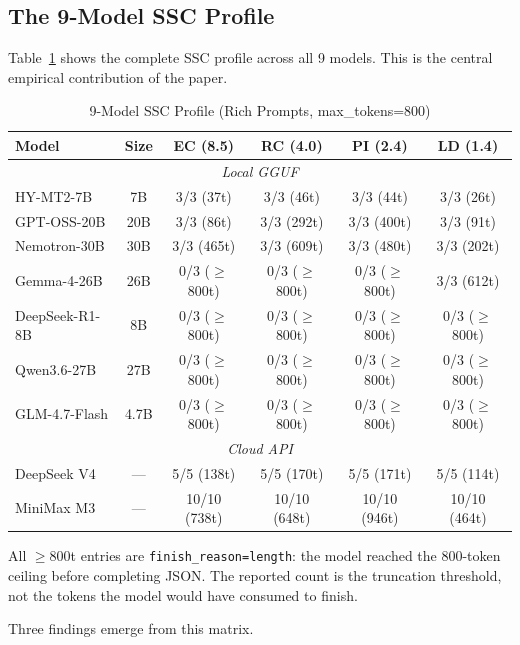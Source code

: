 \documentclass[11pt,a4paper]{article}
\begin{document}
\subsection{The 9-Model SSC Profile}

Table~\ref{tab:ssc_profile} shows the complete SSC profile across all 9 models. This is the central empirical contribution of the paper.

\begin{table}[htbp]\centering\caption{9-Model SSC Profile (Rich Prompts, max\_tokens=800)}\label{tab:ssc_profile}\footnotesize
\begin{tabular}{lccccc}\toprule\textbf{Model} & \textbf{Size} & \textbf{EC (8.5)} & \textbf{RC (4.0)} & \textbf{PI (2.4)} & \textbf{LD (1.4)}\\\midrule
\multicolumn{6}{c}{\textit{Local GGUF}}\\\midrule
HY-MT2-7B & 7B & 3/3 (37t) & 3/3 (46t) & 3/3 (44t) & 3/3 (26t)\\
GPT-OSS-20B & 20B & 3/3 (86t) & 3/3 (292t) & 3/3 (400t) & 3/3 (91t)\\
Nemotron-30B & 30B & 3/3 (465t) & 3/3 (609t) & 3/3 (480t) & 3/3 (202t)\\
Gemma-4-26B & 26B & 0/3 ($\geq$800t) & 0/3 ($\geq$800t) & 0/3 ($\geq$800t) & 3/3 (612t)\\
DeepSeek-R1-8B & 8B & 0/3 ($\geq$800t) & 0/3 ($\geq$800t) & 0/3 ($\geq$800t) & 0/3 ($\geq$800t)\\
Qwen3.6-27B & 27B & 0/3 ($\geq$800t) & 0/3 ($\geq$800t) & 0/3 ($\geq$800t) & 0/3 ($\geq$800t)\\
GLM-4.7-Flash & 4.7B & 0/3 ($\geq$800t) & 0/3 ($\geq$800t) & 0/3 ($\geq$800t) & 0/3 ($\geq$800t)\\\midrule
\multicolumn{6}{c}{\textit{Cloud API}}\\\midrule
DeepSeek V4 & --- & 5/5 (138t) & 5/5 (170t) & 5/5 (171t) & 5/5 (114t)\\
MiniMax M3 & --- & 10/10 (738t) & 10/10 (648t) & 10/10 (946t) & 10/10 (464t)\\\bottomrule
\end{tabular}

\vspace{4pt}
{\footnotesize All $\geq$800t entries are \texttt{finish\_reason=length}: the model reached the 800-token ceiling before completing JSON. The reported count is the truncation threshold, not the tokens the model would have consumed to finish.}
\end{table}

Three findings emerge from this matrix.
\end{document}
